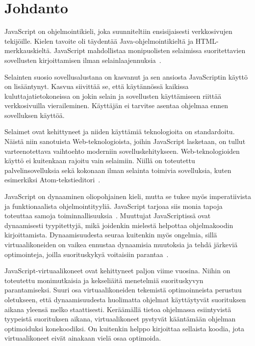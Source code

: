 \section{Johdanto}

JavaScript on ohjelmointikieli, joka suunniteltiin ensisijaisesti verkkosivujen tekijöille. Kielen tavoite oli täydentää Java-ohjelmointikieltä ja HTML-merkkauskieltä. JavaScript mahdollistaa monipuolisten selaimissa suoritettavien sovellusten kirjoittamisen ilman selainlaajennuksia~\cite{paolini1994netscape}.

Selainten suosio sovellusalustana on kasvanut ja sen ansiosta JavaScriptin käyttö on lisääntynyt. Kasvua siivittää se, että käytännössä kaikissa kuluttajatietokoneissa on jokin selain ja sovellusten käyttämiseen riittää verkkosivuilla vieraileminen. Käyttäjän ei tarvitse asentaa ohjelmaa ennen sovelluksen käyttöä.

Selaimet ovat kehittyneet ja niiden käyttämiä teknologioita on standardoitu. Näistä niin sanotuista Web-teknologioista, joihin JavaScript lasketaan, on tullut varteenotettava vaihtoehto moderniin sovelluskehitykseen. Web-teknologioiden käyttö ei kuitenkaan rajoitu vain selaimiin. Niillä on toteutettu palvelinsovelluksia sekä kokonaan ilman selainta toimivia sovelluksia, kuten esimerkiksi Atom-tekstieditori~\cite{atom}.

JavaScript on dynaaminen oliopohjainen kieli, mutta se tukee myös imperatiivista ja funktionaalista ohjelmointityyliä. JavaScript tarjoaa siis monia tapoja toteuttaa samoja toiminnallisuuksia~\cite[luku 4.2.1.]{es6}. Muuttujat JavaScriptissä ovat dynaamisesti tyypitettyjä, mikä joidenkin mielestä helpottaa ohjelmakoodin kirjoittamista. Dynaamisuudesta seuraa kuitenkin myös ongelmia, sillä virtuaalikoneiden on vaikea ennustaa dynaamisia muutoksia ja tehdä järkeviä optimointeja, joilla suorituskykyä voitaisiin parantaa~\cite[s.~497]{Ahn2014}.

JavaScript-virtuaalikoneet ovat kehittyneet paljon viime vuosina. Niihin on toteutettu monimutkaisia ja kekseliäitä menetelmiä suorituskyvyn parantamiseksi. Suuri osa virtuaalikoneiden tekemistä optimoinneista perustuu oletukseen, että dynaamisuudesta huolimatta ohjelmat käyttäytyvät suorituksen aikana yleensä melko staattisesti. Keräämällä tietoa ohjelmassa esiintyvistä tyypeistä suorituksen aikana, virtuaalikoneet pystyvät kääntämään ohjelman optimoiduksi konekoodiksi. On kuitenkin helppo kirjoittaa sellaista koodia, jota virtuaalikoneet eivät ainakaan vielä osaa optimoida.


